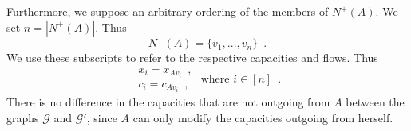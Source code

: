 Furthermore, we suppose an arbitrary ordering of the members of $N^{+}\left(A\right)$. We set $n = |N^{+}\left(A\right)|$.
Thus
\begin{equation*}
  N^{+}\left(A\right) = \{v_1, ..., v_n\} \enspace.
\end{equation*}
We use these subscripts to refer to the respective capacities and flows. Thus
\begin{equation*}
  \begin{array}{l}
    x_i = x_{Av_i} \enspace, \\
    c_i = c_{Av_i} \enspace,
  \end{array}
  \mbox{ where } i \in [n] \enspace.
\end{equation*}
There is no difference in the capacities that are not outgoing from $A$ between the graphs $\mathcal{G}$ and $\mathcal{G}'$,
since $A$ can only modify the capacities outgoing from herself.
